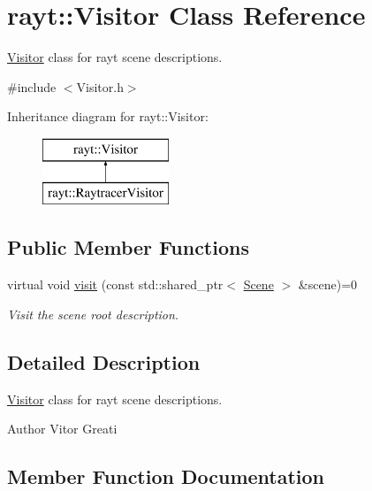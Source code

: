 \hypertarget{classrayt_1_1_visitor}{}\section{rayt\+::Visitor Class Reference}
\label{classrayt_1_1_visitor}


\mbox{\hyperlink{classrayt_1_1_visitor}{Visitor}} class for rayt scene descriptions.  




{\ttfamily \#include $<$Visitor.\+h$>$}

Inheritance diagram for rayt\+::Visitor\+:\begin{figure}[H]
\begin{center}
\leavevmode
\includegraphics[height=2.000000cm]{classrayt_1_1_visitor}
\end{center}
\end{figure}
\subsection*{Public Member Functions}
\begin{DoxyCompactItemize}
\item 
virtual void \mbox{\hyperlink{classrayt_1_1_visitor_a86711f9694cba733e9ce9c7720ee9197}{visit}} (const std\+::shared\+\_\+ptr$<$ \mbox{\hyperlink{classrayt_1_1_scene}{Scene}} $>$ \&scene)=0
\begin{DoxyCompactList}\small\item\em Visit the scene root description. \end{DoxyCompactList}\end{DoxyCompactItemize}


\subsection{Detailed Description}
\mbox{\hyperlink{classrayt_1_1_visitor}{Visitor}} class for rayt scene descriptions. 

\begin{DoxyAuthor}{Author}
Vitor Greati 
\end{DoxyAuthor}


\subsection{Member Function Documentation}
\mbox{\label{classrayt_1_1_visitor_a86711f9694cba733e9ce9c7720ee9197}} 

